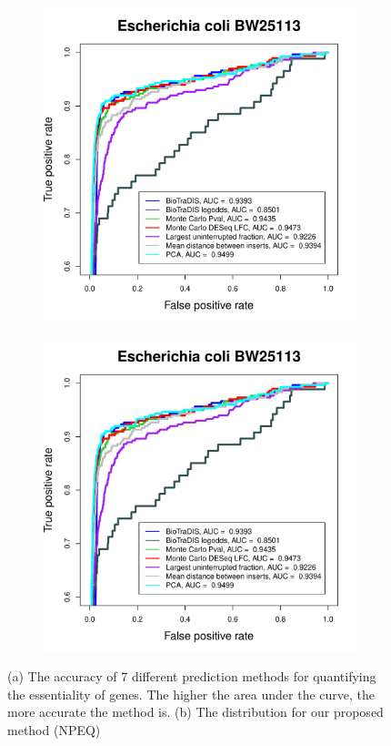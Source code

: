 \documentclass[12pt,letterpaper]{article}
\begin{document}
\begin{figure}
\captionsetup[subfigure]{justification=centering}
\begin{subfigure}{.5\textwidth}
  \centering
  \includegraphics[page=1, scale=0.4]{essential-call-comparison-BW25113.pdf}
  \caption{}
  \label{fig:benchmark}
\end{subfigure}%
\begin{subfigure}{.5\textwidth}
  \centering
  \includegraphics[page=10, scale=0.4]{essential-call-comparison-BW25113.pdf}
  \caption{}
  \label{fig:pca}
\end{subfigure}
\caption{(a) The accuracy of 7 different prediction methods for quantifying the essentiality of genes. The higher the area under the curve, the more accurate the method is. (b) The distribution for our proposed method (NPEQ)}
\label{fig:essentiality-call}
\end{figure}
\end{document}
